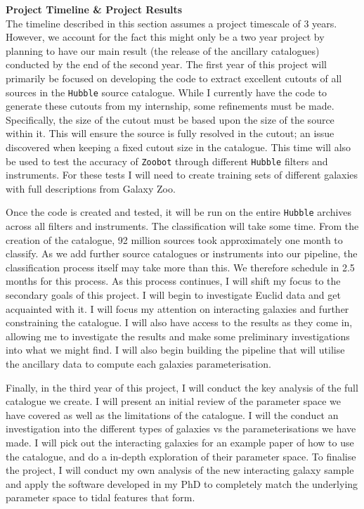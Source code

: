 \documentclass[11pt,usenatbib]{article}
\begin{document}
\vspace{-3mm}
\describearchival
\vspace{-3mm}
\noindent\textbf{Project Timeline \& Project Results} \\
\noindent The timeline described in this section assumes a project timescale of 3 years. However, we account for the fact this might only be a two year project by planning to have our main result (the release of the ancillary catalogues) conducted by the end of the second year. The first year of this project will primarily be focused on developing the code to extract excellent cutouts of all sources in the \texttt{Hubble} source catalogue. While I currently have the code to generate these cutouts from my internship, some refinements must be made. Specifically, the size of the cutout must be based upon the size of the source within it. This will ensure the source is fully resolved in the cutout; an issue discovered when keeping a fixed cutout size in the \citet{O'Ryan} catalogue. This time will also be used to test the accuracy of \texttt{Zoobot} through different \texttt{Hubble} filters and instruments. For these tests I will need to create training sets of different galaxies with full descriptions from Galaxy Zoo.

Once the code is created and tested, it will be run on the entire \texttt{Hubble} archives across all filters and instruments. The classification will take some time. From the creation of the \citet{O'Ryan} catalogue, 92 million sources took approximately one month to classify. As we add further source catalogues or instruments into our pipeline, the classification process itself may take more than this. We therefore schedule in 2.5 months for this process. As this process continues, I will shift my focus to the secondary goals of this project. I will begin to investigate Euclid data and get acquainted with it. I will focus my attention on interacting galaxies and further constraining the \citet{O'Ryan} catalogue. I will also have access to the results as they come in, allowing me to investigate the results and make some preliminary investigations into what we might find. I will also begin building the pipeline that will utilise the ancillary data to compute each galaxies parameterisation.

Finally, in the third year of this project, I will conduct the key analysis of the full catalogue we create. I will present an initial review of the parameter space we have covered as well as the limitations of the catalogue. I will the conduct an investigation into the different types of galaxies vs the parameterisations we have made. I will pick out the interacting galaxies for an example paper of how to use the catalogue, and do a in-depth exploration of their parameter space. To finalise the project, I will conduct my own analysis of the new interacting galaxy sample and apply the software developed in my PhD to completely match the underlying parameter space to tidal features that form. \\
\end{document}
